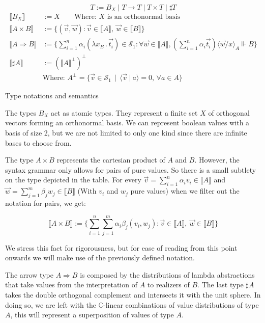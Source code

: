 \documentclass[runningheads,orivec]{llncs}
\newcommand\comp[2][]{#2^{\bot^{#1}}}
\newcommand\ansubst[2]{\ensuremath{\langle #1 \rangle_{#2}}}
\def\C{\mathbb{C}}            %
\def\Sph{\mathcal{S}_1}       %
\def\scal#1#2{\langle{#1}~|~{#2}\rangle}
\def\Lam#1#2#3{\lambda#1_{#2}\,{.}\,#3} %
\def\Arr{\Rightarrow}
\def\sem#1{\llbracket#1\rrbracket}
\def\real{\Vdash}
\newcommand\basis[1]{\ensuremath{B_{ #1 }}}
\begin{document}
\begin{table*}[tb]
  \scriptsize
    \[
    T := \basis{X} \mid T\to T \mid T\times T \mid \sharp T
    \]
    \begin{align*}
    \sem{\basis{X}}&:= X\qquad\text{Where: $X$ is an orthonormal basis}\\
    \sem{A\times B}&:= \bigl\{ (\vec v, \vec w): \vec v \in{\sem{A}},~\vec w\in\sem{B}\bigr\}\\
    \sem{A\Arr B}&:=
    \bigl\{\sum_{i=1}^{n}\alpha_i(\Lam{x}{B}{\vec{t_i}})\in\Sph:\forall\vec{w}\in\sem{A}, (\sum_{i=1}^{n}\alpha_i \vec{t_i})\ansubst{\vec{w}/x}{A}\real B\bigr\}\\
    \sem{\sharp{A}}&:= {(\sem{A}^\bot)}^\bot\\
    &\text{Where: }\comp{A} = \{ \vec{v}\in \Sph \,\mid\, \scal{\vec{v}}{a} = 0,\, \forall a\in A\}
  \end{align*}
  \caption{Type notations and semantics}
  \label{tab:UnitaryTypes}
\end{table*}

The types $\basis{X}$ act as atomic types. They represent a finite set $X$ of orthogonal vectors forming an orthonormal basis. We can represent boolean values with a basis of size 2, but we are not limited to only one kind since there are infinite bases to choose from.

The type $A\times B$ represents the cartesian product of $A$ and $B$. However, the syntax grammar only allows for pairs of pure values. So there is a small subtlety on the type depicted in the table. For every $\vec{v}=\sum_{i=1}^{n}\alpha_i v_i\in\sem{A}$ and $\vec{w}=\sum_{j=1}^{m}\beta_j w_j\in\sem{B}$ (With $v_i$ and $w_j$ pure values) when we filter out the notation for pairs, we get:

\[
  \sem{A\times B}:= \bigl\{ \sum_{i=1}^{n}\sum_{j=1}^{m}\alpha_i\beta_j(v_i, w_j): \vec v \in{\sem{A}},~\vec w\in\sem{B}\bigr\}
\]

We stress this fact for rigorousness, but for ease of reading from this point onwards we will make use of the previously defined notation.

The arrow type $A\Arr B$ is composed by the distributions of lambda abstractions that take values from the interpretation of $A$ to realizers of $B$. The last type $\sharp A$ takes the double orthogonal complement and intersects it with the unit sphere. In doing so, we are left with the $\C$-linear combinations of value distributions of type $A$, this will represent a superposition of values of type $A$.
\end{document}
